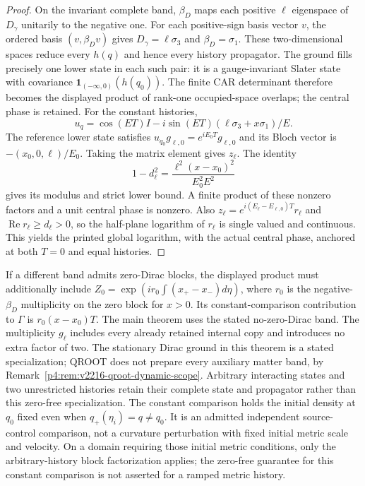\documentclass[12pt,a4paper]{article}
\begin{document}
\begin{proof}
On the invariant complete band, $\beta_D$ maps each positive
$\ell$ eigenspace of $D_\gamma$ unitarily to the negative one.
For each positive-sign basis vector $v$, the ordered basis
$(v,\beta_Dv)$ gives $D_\gamma=\ell\sigma_3$ and
$\beta_D=\sigma_1$. These two-dimensional spaces reduce every
$h(q)$ and hence every history propagator. The ground fills precisely
one lower state in each such pair: it is a gauge-invariant Slater state
with covariance $\mathbf1_{(-\infty,0)}(h(q_0))$.
The finite CAR determinant therefore becomes the displayed product
of rank-one occupied-space overlaps; the central phase is retained.
For the constant histories,
\[
 u_q=\cos(ET)I-i\sin(ET)
        (\ell\sigma_3+x\sigma_1)/E.
\]
The reference lower state satisfies
$u_{q_0}g_{\ell,0}=e^{iE_0T}g_{\ell,0}$ and its Bloch vector is
$-(x_0,0,\ell)/E_0$. Taking the matrix element gives $z_\ell$.
The identity
\[
 1-d_\ell^2=
 \frac{\ell^2(x-x_0)^2}{E_0^2E^2}
\]
gives its modulus and strict lower bound. A finite product of these
nonzero factors and a unit central phase is nonzero. Also
$z_\ell=e^{i(E_\ell-E_{\ell,0})T}r_\ell$ and
$\operatorname{Re}r_\ell\ge d_\ell>0$, so the half-plane logarithm
of $r_\ell$ is single valued and continuous. This yields the printed
global logarithm, with the actual central phase, anchored at both
$T=0$ and equal histories.
\end{proof}
If a different band admits zero-Dirac blocks, the displayed product
must additionally include
$Z_0=\exp(i r_0\int(x_+-x_-)d\eta)$, where $r_0$ is the
negative-$\beta_D$ multiplicity on the zero block for $x>0$.
Its constant-comparison contribution to $\Gamma$ is
$r_0(x-x_0)T$. The main theorem uses the stated no-zero-Dirac band. The multiplicity $g_\ell$ includes every
already retained internal copy and introduces no extra factor of two.
The stationary Dirac ground in this theorem is a stated specialization;
QROOT does not prepare every auxiliary matter band, by
Remark~\ref{p4:rem:v2216-qroot-dynamic-scope}. Arbitrary interacting states and two unrestricted histories retain their
complete state and propagator rather than this zero-free specialization.
The constant comparison holds the initial density at $q_0$ fixed even
when $q_+(\eta_i)=q\ne q_0$. It is an admitted independent
source-control comparison, not a curvature perturbation with fixed
initial metric scale and velocity. On a domain requiring those
initial metric conditions, only the arbitrary-history block
factorization applies; the zero-free guarantee for this constant
comparison is not asserted for a ramped metric history.
\end{document}
